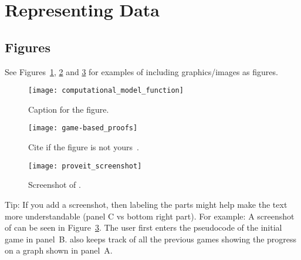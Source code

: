 \section{Representing Data}

\subsection{Figures}

See Figures~\ref{fig:fnCompModel}, \ref{fig:game-based_proofs} and \ref{fig:proveit_screenshot} for examples of including graphics/images as figures.

\begin{figure}[h] %
    \centering
    \texttt{[image: computational\_model\_function]}
    \caption{Caption for the figure.}
    \label{fig:fnCompModel}
\end{figure}

\begin{figure}[h] %
    \centering
    \texttt{[image: game-based\_proofs]}
    \caption{Cite if the figure is not yours~\cite{kamm12}.}
    \label{fig:game-based_proofs}
\end{figure}

\begin{figure}
    \centering
    \texttt{[image: proveit\_screenshot]}
    \caption{Screenshot of \proveit.}
    \label{fig:proveit_screenshot}
\end{figure}

Tip: If you add a screenshot, then labeling the parts might help make the text more understandable (panel C vs bottom right part). For example:
A screenshot of \proveit can be seen in Figure~\ref{fig:proveit_screenshot}.
The user first enters the pseudocode of the initial game in panel~B.
\proveit also keeps track of all the previous games showing the progress on a graph shown in panel~A.

